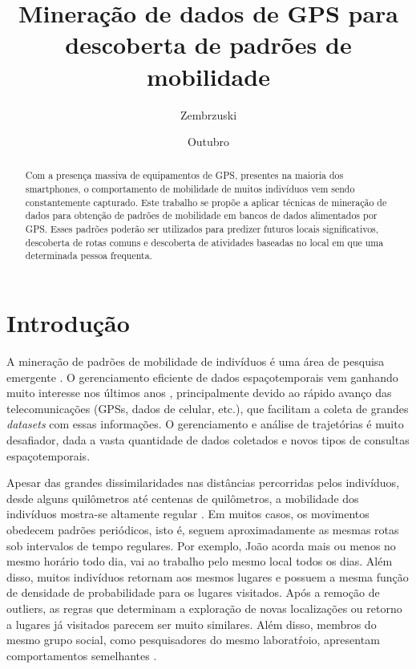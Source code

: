 \documentclass[ppgc,pep]{iiufrgs}
\title{Mineração de dados de GPS para descoberta de padrões de mobilidade}
\author{Zembrzuski}{Rodrigo Claro}
\date{Outubro}{2017}
\begin{document}
\makeatletter
\let\@makenominatapage\relax
\makeatother
\maketitle

\begin{abstract}
Com a presença massiva de equipamentos de GPS, presentes na maioria dos smartphones, o comportamento 
de mobilidade de muitos indivíduos vem sendo constantemente capturado. Este trabalho 
se propõe a aplicar técnicas de mineração de dados para obtenção de padrões de mobilidade em 
bancos de dados alimentados por GPS. Esses padrões poderão ser utilizados para predizer futuros
locais significativos, descoberta de rotas comuns e descoberta de atividades baseadas no local
em que uma determinada pessoa frequenta.
\end{abstract}

\chapter{Introdução}

A mineração de padrões de mobilidade de indivíduos é uma
área de pesquisa emergente \cite{lin2014mining}. O gerenciamento eficiente
de dados espaçotemporais vem ganhando muito interesse nos
últimos anos \cite{Tao:2001:MSA:645927.672363}, principalmente devido
ao rápido avanço das telecomunicações (GPSs, dados de
celular, etc.), que facilitam a coleta de grandes {\it datasets}
com essas informações. O gerenciamento e análise de trajetórias
é muito desafiador, dada a vasta quantidade de dados
coletados e novos tipos de consultas espaçotemporais.

Apesar das grandes dissimilaridades nas distâncias percorridas
pelos indivíduos, desde alguns quilômetros até centenas
de quilômetros, a mobilidade dos indivíduos mostra-se altamente
regular \cite{song2010limits}. Em muitos casos, os movimentos obedecem padrões
periódicos, isto é, seguem aproximadamente as mesmas rotas
sob intervalos de tempo regulares. Por exemplo, João acorda
mais ou menos no mesmo horário todo dia, vai ao trabalho
pelo mesmo local todos os dias. Além disso, muitos indivíduos 
retornam aos mesmos lugares e
possuem a mesma função de densidade de probabilidade para
os lugares visitados. Após a remoção de outliers, as regras
que determinam a exploração de novas localizações ou retorno a 
lugares já visitados parecem ser muito similares. Além disso,
membros do mesmo grupo social, como pesquisadores do mesmo 
laboratŕoio, apresentam comportamentos semelhantes \cite{gonzalez08}.
\end{document}
